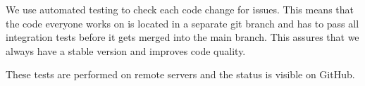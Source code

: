 We use automated testing to check each code change for issues. This means that the code everyone works on is located in a separate git branch \cite{gitbranch} and has to pass all integration tests before it gets merged into the main branch. This assures that we always have a stable version and improves code quality.

These tests are performed on remote servers and the status is visible on GitHub. \cite{githubci}
